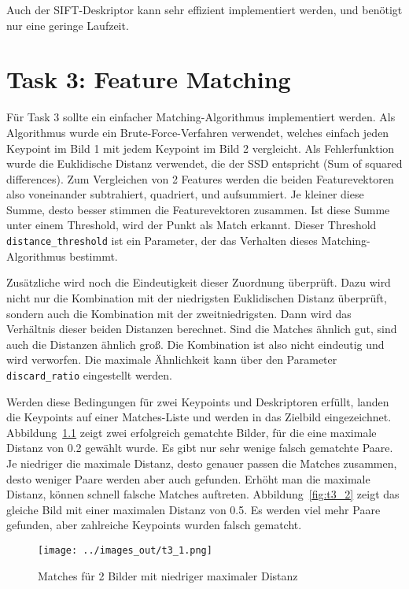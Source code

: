 Auch der SIFT-Deskriptor kann sehr effizient implementiert werden, und benötigt nur eine geringe Laufzeit.


\clearpage



\chapter{Task 3: Feature Matching}

Für Task 3 sollte ein einfacher Matching-Algorithmus implementiert werden. Als Algorithmus wurde ein Brute-Force-Verfahren verwendet, welches einfach jeden Keypoint im Bild 1 mit jedem Keypoint im Bild 2 vergleicht. Als Fehlerfunktion wurde die Euklidische Distanz verwendet, die der SSD entspricht (Sum of squared differences). Zum Vergleichen von 2 Features werden die beiden Featurevektoren also voneinander subtrahiert, quadriert, und aufsummiert. Je kleiner diese Summe, desto besser stimmen die Featurevektoren zusammen. Ist diese Summe unter einem Threshold, wird der Punkt als Match erkannt. Dieser Threshold \texttt{distance\_threshold} ist ein Parameter, der das Verhalten dieses Matching-Algorithmus bestimmt.

Zusätzliche wird noch die Eindeutigkeit dieser Zuordnung überprüft. Dazu wird nicht nur die Kombination mit der niedrigsten Euklidischen Distanz überprüft, sondern auch die Kombination mit der zweitniedrigsten. Dann wird das Verhältnis dieser beiden Distanzen berechnet. Sind die Matches ähnlich gut, sind auch die Distanzen ähnlich groß. Die Kombination ist also nicht eindeutig und wird verworfen. Die maximale Ähnlichkeit kann über den Parameter \texttt{discard\_ratio} eingestellt werden.

Werden diese Bedingungen für zwei Keypoints und Deskriptoren erfüllt, landen die Keypoints auf einer Matches-Liste und werden in das Zielbild eingezeichnet. Abbildung~\ref{fig:t3_1} zeigt zwei erfolgreich gematchte Bilder, für die eine maximale Distanz von 0.2 gewählt wurde. Es gibt nur sehr wenige falsch gematchte Paare. Je niedriger die maximale Distanz, desto genauer passen die Matches zusammen, desto weniger Paare werden aber auch gefunden. Erhöht man die maximale Distanz, können schnell falsche Matches auftreten. Abbildung~\ref{fig:t3_2} zeigt das gleiche Bild mit einer maximalen Distanz von 0.5. Es werden viel mehr Paare gefunden, aber zahlreiche Keypoints wurden falsch gematcht.

\begin{figure}[htb]
 \centering
 \texttt{[image: ../images\_out/t3\_1.png]}
 \caption{Matches für 2 Bilder mit niedriger maximaler Distanz}
 \label{fig:t3_1}
\end{figure}

